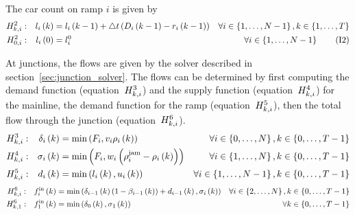The car count on ramp $i$ is given by 
\begin{align}
H^{2}_{k, i}: && l_{i}\left(k\right) & =l_{i}\left(k-1\right)+\triangle t\left(D_{i}\left(k-1\right)-r_{i}\left(k-1\right)\right) & \forall i\in\left\{ 1,\ldots,N-1\right\} ,k\in\left\{ 1,\ldots,T\right\}
\label{eq:rampConservation}
\\
H^{2}_{0, i}: && l_{i}\left(0\right) & =l_{i}^{0} & \forall i\in\left\{ 1,\ldots,N-1\right\}
\tag{I2}\label{eq:rampInit}
\end{align}


At junctions, the flows are given by the solver described in section~\ref{sec:junction_solver}. The flows can be determined by first computing the demand function (equation~$H^{3}_{k, i}$) and the supply function (equation~$H^{4}_{k, i}$) for the mainline, the demand function for the ramp (equation~$H^{5}_{k, i}$), then the total flow through the junction (equation~$H^{6}_{k, i}$).
\begin{align}
H^{3}_{k, i}: && \delta_{i}\left(k\right) & =\min\left(F_{i},v_{i}\rho_{i}\left(k\right)\right) & \forall i\in\left\{ 0,\ldots,N\right\} ,k\in\left\{ 0,\ldots,T-1\right\}
\label{eq:junctionDemand} \\
H^{4}_{k, i}: && \sigma_{i}\left(k\right) & =\min\left(F_{i},w_{i}\left(\rho^{\text{jam}}_{i}-\rho_{i}\left(k\right)\right)\right) & \forall i\in\left\{ 1,\ldots,N\right\} ,k\in\left\{ 0,\ldots,T-1\right\} 
\label{eq:junctionSupply} \\
H^{5}_{k, i}: && d_{i}\left(k\right) & =\min\left(l_{i}\left(k\right),u_{i}\left(k\right)\right) & \forall i\in\left\{ 1,\ldots,N-1\right\} ,k\in\left\{ 0,\ldots,T-1\right\} 
\label{eq:junctionRampDemand}
\end{align}
\begin{subequations}
\begin{align}
H^{6}_{k, i}: && f_{i}^{\text{in}}\left(k\right) & =\min\left(\delta_{i-1}\left(k\right)\left(1-\beta_{i-1}\left(k\right)\right)+d_{i-1}\left(k\right),\sigma_{i}\left(k\right)\right) & \forall i\in\left\{ 2,\ldots,N\right\} ,k\in\left\{ 0,\ldots,T-1\right\}
\label{eq:junctionFlowMaximization} \\
H^{6}_{k, 1}: && f_{1}^{\text{in}}\left(k\right) & =\min\left(\delta_{0}\left(k\right),\sigma_{1}\left(k\right)\right) &
\forall k\in\left\{ 0,\ldots,T-1\right\}
\label{eq:junctionFlowConservationSpecial2}	
\end{align}
\label{eq:juncmaxgroup}
\end{subequations}


